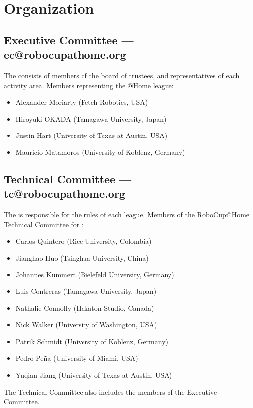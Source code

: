 \section{Organization}

\subsection{Executive Committee --- ec@robocupathome.org}
\label{sec:ec}
The  consists of members of the board of trustees, and representatives of each activity area. Members representing the @Home league:
\begin{itemize}
	\item Alexander Moriarty (Fetch Robotics, USA)
	\item Hiroyuki OKADA (Tamagawa University, Japan)
	\item Justin Hart (University of Texas at Austin, USA)
	\item Mauricio Matamoros (University of Koblenz, Germany)
\end{itemize}

\subsection{Technical Committee --- tc@robocupathome.org}
\label{sec:tc}
The  is responsible for the rules of each league. Members of the RoboCup@Home Technical Committee for \YEAR:
\begin{itemize}
	\item Carlos Quintero (Rice University, Colombia)
	\item Jianghao Huo (Tsinghua University, China)
	\item Johannes Kummert (Bielefeld University, Germany)
	\item Luis Contreras (Tamagawa University, Japan)
	\item Nathalie Connolly (Hekaton Studio, Canada)
	\item Nick Walker (University of Washington, USA)
	\item Patrik Schmidt (University of Koblenz, Germany)
	\item Pedro Peña (University of Miami, USA)
	\item Yuqian Jiang (University of Texas at Austin, USA)
\end{itemize}
The Technical Committee also includes the members of the Executive Committee.

